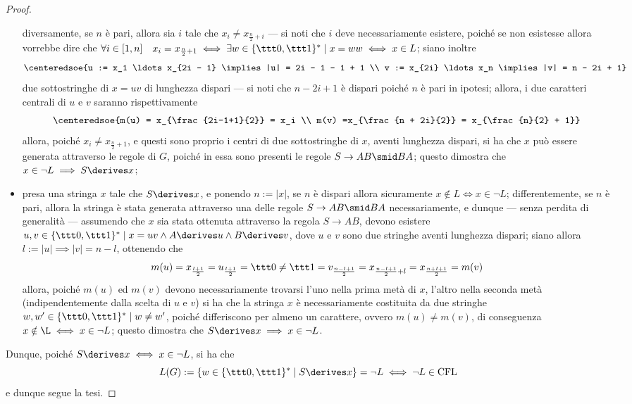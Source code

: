 \documentclass[a4paper, 12pt]{report}
\begin{document}
\begin{proof}
\begin{itemize}
                diversamente, se $n$ è pari, allora sia $i$ tale che $x_i \neq x_{\frac{n}{2} + i}$ --- si noti che $i$ deve necessariamente esistere, poiché se non esistesse allora vorrebbe dire che $\forall i \in [1, n] \quad x_i = x_{\frac{n}{2} + 1} \iff \exists w \in \{\ttt 0, \ttt 1\}^* \mid x = ww \iff x \in L$; siano inoltre $$\centeredsoe{u := x_1 \ldots x_{2i - 1} \implies |u| = 2i - 1 - 1 + 1 \\ v := x_{2i} \ldots x_n \implies |v| = n - 2i + 1}$$ due sottostringhe di $x = uv$ di lunghezza dispari --- si noti che $n - 2i + 1$ è dispari poiché $n$ è pari in ipotesi; allora, i due caratteri centrali di $u$ e $v$ saranno rispettivamente $$\centeredsoe{m(u) = x_{\frac{2i-1+1}{2}} = x_i \\ m(v) =x_{\frac{n + 2i}{2}} = x_{\frac{n}{2} + 1}}$$ allora, poiché $x_i \neq x_{\frac{n}{2} + 1}$, e questi sono proprio i centri di due sottostringhe di $x$, aventi lunghezza dispari, si ha che $x$ può essere generata attraverso le regole di $G$, poiché in essa sono presenti le regole $S \to AB \smid BA$; questo dimostra che $x \in \lnot L \implies S \derives x$;
            \item presa una stringa $x$ tale che $S \derives x$, e ponendo $n := |x|$, se $n$ è dispari allora sicuramente $x \notin L \iff x \in \lnot L$; differentemente, se $n$ è pari, allora la stringa è stata generata attraverso una delle regole $S \to AB \smid BA$ necessariamente, e dunque --- senza perdita di generalità --- assumendo che $x$ sia stata ottenuta attraverso la regola $S \to AB$, devono esistere $u, v \in \{\ttt 0, \ttt 1\}^* \mid x = uv \land A \derives u \land B \derives v$, dove $u$ e $v$ sono due stringhe aventi lunghezza dispari; siano allora $l := |u| \implies |v| = n - l$, ottenendo che $$m (u) = x_{\frac{l + 1}{2}} = u_{\frac{l + 1}{2}} = \ttt 0 \neq \ttt 1 = v_{\frac{n - l + 1}{2}} = x_{\frac{n - l + 1}{2} + l} = x_{\frac{n + l + 1}{2}} = m(v)$$ allora, poiché $m(u)$ ed $m(v)$ devono necessariamente trovarsi l'uno nella prima metà di $x$, l'altro nella seconda metà (indipendentemente dalla scelta di $u$ e $v$) si ha che la stringa $x$ è necessariamente costituita da due stringhe $w, w' \in \{\ttt 0, \ttt 1\}^* \mid w \neq w'$, poiché differiscono per almeno un carattere, ovvero $m(u) \neq m(v)$, di conseguenza $x \notin \L \iff x \in \lnot L$; questo dimostra che $S \derives x \implies x \in \lnot L$.
        \end{itemize}

        Dunque, poiché $S \derives x \iff x \in \lnot L$, si ha che $$L(G) := \{w \in \{\ttt 0, \ttt 1\}^* \mid S \derives x\} = \lnot L \iff \lnot L \in \mathrm{CFL}$$ e dunque segue la tesi.
    \end{proof}
\end{document}
